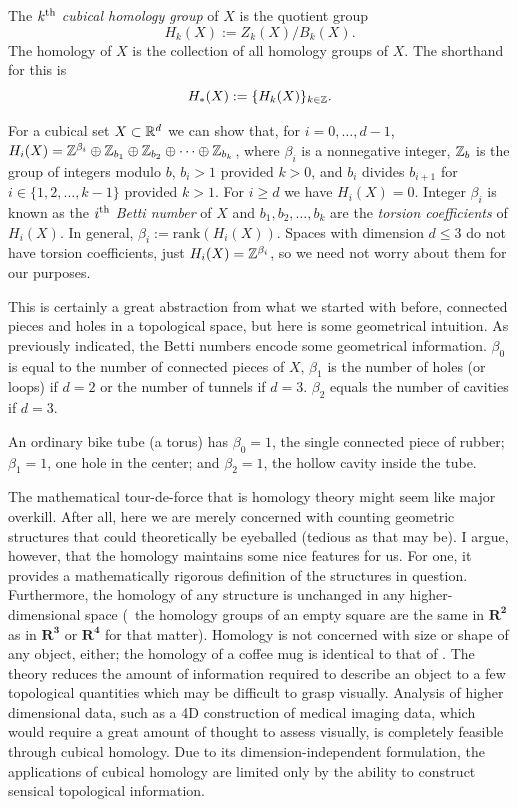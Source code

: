 \begin{defn}
	The $k\textsuperscript{th}$ \textit{cubical homology group} of $X$ is the quotient group
	$$ H_k(X) := Z_k(X) / B_k(X). $$
	The homology of $X$ is the collection of all homology groups of $X$. The shorthand for this is
	$$ H_{*}(X) := \{ H_k(X) \}_{k \in \mathbb{Z}} .$$
\end{defn}

For a cubical set $X \subset \mathbb{R}^d$ we can show that, for $i = 0, \ldots, d-1$, $H_i(X) = \mathbb{Z}^{\beta_i} \oplus \mathbb{Z}_{b_1} \oplus \mathbb{Z}_{b_2} \oplus \cdots \oplus \mathbb{Z}_{b_k}$, where $\beta_i$ is a nonnegative integer, $\mathbb{Z}_b$ is the group of integers modulo $b$, $b_i > 1$ provided $k > 0$, and $b_i$ divides $b_{i+1}$ for $i \in \{ 1, 2, \ldots, k-1 \}$ provided $k > 1$. For $ i \geq d$ we have $H_i(X) = 0$. Integer $\beta_i$ is known as the $i\textsuperscript{th}$ \textit{Betti number} of $X$ and $b_1, b_2, \ldots, b_k$ are the \textit{torsion coefficients} of $H_i(X)$. In general, $\beta_i := \text{rank}( H_i( X ) )$. Spaces with dimension $d \leq 3$ do not have torsion coefficients, just $H_i(X) = \mathbb{Z}^{\beta_i}$, so we need not worry about them for our purposes.

This is certainly a great abstraction from what we started with before, connected pieces and holes in a topological space, but here is some geometrical intuition. As previously indicated, the Betti numbers encode some geometrical information. $\beta_0$ is equal to the number of connected pieces of $X$, $\beta_1$ is the number of holes (or loops) if $d = 2$ or the number of tunnels if $d = 3$. $\beta_2$ equals the number of cavities if $d=3$.

\begin{exmp}
	An ordinary bike tube (a torus) has $\beta_0 = 1$, the single connected piece of rubber; $\beta_1 = 1$, one hole in the center; and $\beta_2 = 1$, the hollow cavity inside the tube.
\end{exmp}

The mathematical tour-de-force that is homology theory might seem like major overkill. After all, here we are merely concerned with counting geometric structures that could theoretically be eyeballed (tedious as that may be). I argue, however, that the homology maintains some nice features for us. For one, it provides a mathematically rigorous definition of the structures in question. Furthermore, the homology of any structure is unchanged in any higher-dimensional space (\eg~the homology groups of an empty square are the same in $\mathbf{R^2}$ as in $\mathbf{R^3}$ or $\mathbf{R^4}$ for that matter). Homology is not concerned with size or shape of any object, either; the homology of a coffee mug is identical to that of . The theory reduces the amount of information required to describe an object to a few topological quantities which may be difficult to grasp visually. Analysis of higher dimensional data, such as a 4D construction of medical imaging data, which would require a great amount of thought to assess visually, is completely feasible through cubical homology. Due to its dimension-independent formulation, the applications of cubical homology are limited only by the ability to construct sensical topological information.


